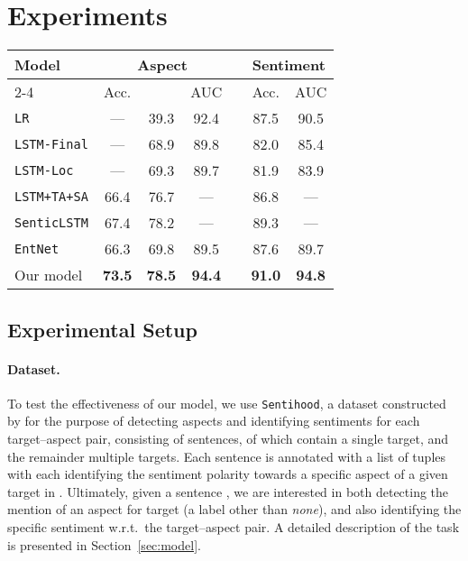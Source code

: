 \documentclass[11pt,a4paper]{article}
\newcommand{\system}[2][]{\texttt{#2#1}\xspace}
\newcommand{\secref}[1]{Section~\ref{#1}\xspace}
\newcommand{\ent}[1][]{\system[#1]{EntNet}}
\newcommand{\sentihood}{\system{Sentihood}}
\begin{document}
 \section{Experiments}

\begin{table*}
\center
\begin{tabular}{lcccccc}
\toprule
\multirow{2}{*}{Model} & \multicolumn{3}{c}{Aspect} & & \multicolumn{2}{c}{Sentiment} \\
\cmidrule{2-4}
\cmidrule{6-7}
 & Acc. &  & AUC && Acc. & AUC \\
\midrule
\system{LR} \cite{Saeidi+:2016}         &  --- & 39.3 & 92.4 && 87.5 & 90.5 \\
\system{LSTM-Final} \cite{Saeidi+:2016} &  --- & 68.9 & 89.8 && 82.0 & 85.4 \\
\system{LSTM-Loc} \cite{Saeidi+:2016}   &  --- & 69.3 & 89.7 && 81.9 & 83.9 \\
\system{LSTM+TA+SA} \cite{Ma+:2018}     & 66.4 & 76.7 &  --- && 86.8 & --- \\
\system{SenticLSTM} \cite{Ma+:2018}     & 67.4 & 78.2 &  --- && 89.3 & --- \\
\ent[]                         & 66.3 & 69.8 & 89.5 && 87.6 & 89.7 \\
Our model                      & \textbf{73.5} & \textbf{78.5}  & \textbf{94.4} && \textbf{91.0} & \textbf{94.8} \\
\bottomrule
\end{tabular}
\caption{Performance on \sentihood. We take the results reported in  and , resp; \textbf{Bold} = best performance; ``---'' = not reported;  = average performance over 5 runs.}
\label{tbl:performance}
\end{table*}

\subsection{Experimental Setup}
\paragraph{Dataset.}
To test the effectiveness of our model, we use \sentihood, a dataset constructed by  for the purpose of detecting aspects and identifying sentiments for each target--aspect pair, consisting of  sentences,  of which contain a single target, and the remainder multiple targets. Each sentence is annotated with a list of tuples  with each identifying the sentiment polarity  towards a specific aspect  of a given target  in . Ultimately, given a sentence , we are interested in both detecting the mention of an aspect  for target  (a label other than \textit{none}), and also identifying the specific sentiment  w.r.t.\ the target--aspect pair. A detailed description of the task is presented in \secref{sec:model}.
\end{document}
